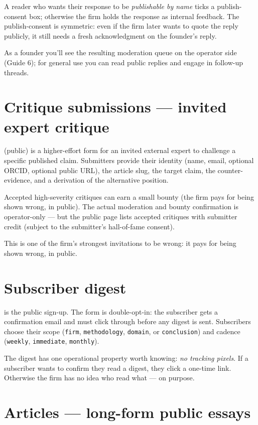 \documentclass[11pt]{article}
\begin{document}
A reader who wants their response to be \emph{publishable by name}
ticks a publish-consent box; otherwise the firm holds the response as
internal feedback. The publish-consent is symmetric: even if the firm
later wants to quote the reply publicly, it still needs a fresh
acknowledgment on the founder's reply.

As a founder you'll see the resulting moderation queue on the
operator side (Guide 6); for general use you can read public replies
and engage in follow-up threads.

\section{Critique submissions --- invited expert critique}

 (public) is a higher-effort form for an invited
external expert to challenge a specific published claim. Submitters
provide their identity (name, email, optional ORCID, optional public
URL), the article slug, the target claim, the counter-evidence, and a
derivation of the alternative position.

Accepted high-severity critiques can earn a small bounty (the firm
pays for being shown wrong, in public). The actual moderation and
bounty confirmation is operator-only --- but the public
 page lists accepted critiques with submitter credit
(subject to the submitter's hall-of-fame consent).

This is one of the firm's strongest invitations to be wrong: it pays
for being shown wrong, in public.

\section{Subscriber digest}

 is the public sign-up. The form is double-opt-in:
the subscriber gets a confirmation email and must click through
before any digest is sent. Subscribers choose their scope
(\texttt{firm}, \texttt{methodology}, \texttt{domain}, or
\texttt{conclusion}) and cadence (\texttt{weekly}, \texttt{immediate},
\texttt{monthly}).

The digest has one operational property worth knowing: \emph{no
tracking pixels}. If a subscriber wants to confirm they read a
digest, they click a one-time link. Otherwise the firm has no idea
who read what --- on purpose.

\section{Articles --- long-form public essays}
\end{document}
